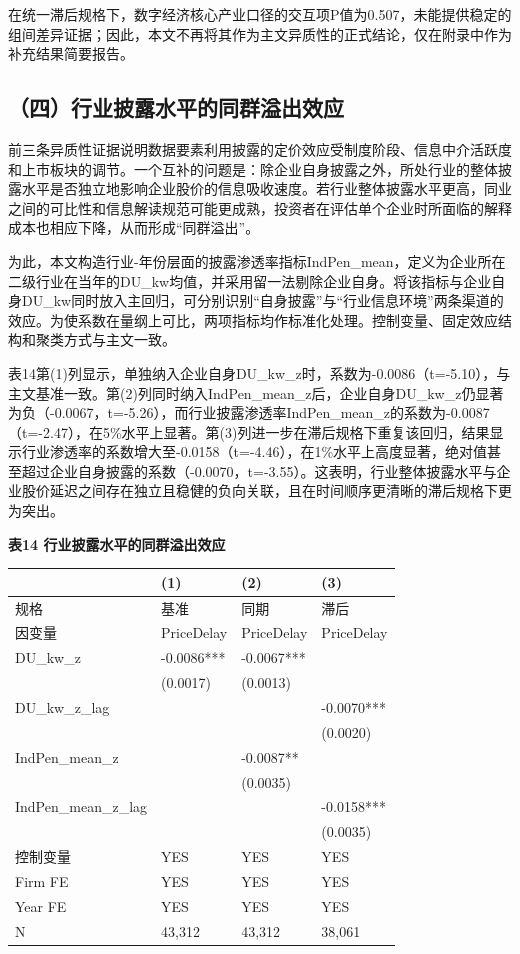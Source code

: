 在统一滞后规格下，数字经济核心产业口径的交互项P值为0.507，未能提供稳定的组间差异证据；因此，本文不再将其作为主文异质性的正式结论，仅在附录中作为补充结果简要报告。

\subsection{（四）行业披露水平的同群溢出效应}\label{ux56dbux884cux4e1aux62abux9732ux6c34ux5e73ux7684ux540cux7fa4ux6ea2ux51faux6548ux5e94}

前三条异质性证据说明数据要素利用披露的定价效应受制度阶段、信息中介活跃度和上市板块的调节。一个互补的问题是：除企业自身披露之外，所处行业的整体披露水平是否独立地影响企业股价的信息吸收速度。若行业整体披露水平更高，同业之间的可比性和信息解读规范可能更成熟，投资者在评估单个企业时所面临的解释成本也相应下降，从而形成``同群溢出''。

为此，本文构造行业-年份层面的披露渗透率指标IndPen\_mean，定义为企业所在二级行业在当年的DU\_kw均值，并采用留一法剔除企业自身。将该指标与企业自身DU\_kw同时放入主回归，可分别识别``自身披露''与``行业信息环境''两条渠道的效应。为使系数在量纲上可比，两项指标均作标准化处理。控制变量、固定效应结构和聚类方式与主文一致。

表14第(1)列显示，单独纳入企业自身DU\_kw\_z时，系数为-0.0086（t=-5.10），与主文基准一致。第(2)列同时纳入IndPen\_mean\_z后，企业自身DU\_kw\_z仍显著为负（-0.0067，t=-5.26），而行业披露渗透率IndPen\_mean\_z的系数为-0.0087（t=-2.47），在5\%水平上显著。第(3)列进一步在滞后规格下重复该回归，结果显示行业渗透率的系数增大至-0.0158（t=-4.46），在1\%水平上高度显著，绝对值甚至超过企业自身披露的系数（-0.0070，t=-3.55）。这表明，行业整体披露水平与企业股价延迟之间存在独立且稳健的负向关联，且在时间顺序更清晰的滞后规格下更为突出。

\textbf{表14 行业披露水平的同群溢出效应}

{\def\LTcaptype{} %
\begin{longtable}[]{@{}llll@{}}
\toprule\noalign{}
& (1) & (2) & (3) \\
\midrule\noalign{}
\endhead
\bottomrule\noalign{}
\endlastfoot
规格 & 基准 & 同期 & 滞后 \\
因变量 & PriceDelay & PriceDelay & PriceDelay \\
DU\_kw\_z & -0.0086*** & -0.0067*** & \\
& (0.0017) & (0.0013) & \\
DU\_kw\_z\_lag & & & -0.0070*** \\
& & & (0.0020) \\
IndPen\_mean\_z & & -0.0087** & \\
& & (0.0035) & \\
IndPen\_mean\_z\_lag & & & -0.0158*** \\
& & & (0.0035) \\
控制变量 & YES & YES & YES \\
Firm FE & YES & YES & YES \\
Year FE & YES & YES & YES \\
N & 43,312 & 43,312 & 38,061 \\
\end{longtable}
}


